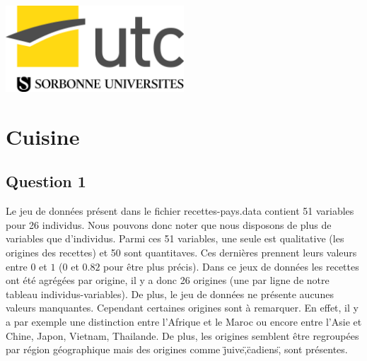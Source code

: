 \documentclass[a4paper,11pt,oneside,roman]{article}
\begin{document}
\begin{titlepage}
        
        \includegraphics[width=0.5\textwidth]{imgs/logo_UTC_SU.jpg}\\[1cm] %
        
    
        \vfill %
        
    \end{titlepage}
    
    
    \pagebreak
        
    \section{Cuisine}
    \subsection*{Question 1}
    Le jeu de données présent dans le fichier recettes-pays.data contient 51 variables pour 26 individus.
    Nous pouvons donc noter que nous disposons de plus de variables que d'individus.
    Parmi ces 51 variables, une seule est qualitative (les origines des recettes) et 50 sont quantitaves.
    Ces dernières prennent leurs valeurs entre $0$ et $1$ ($0$ et $0.82$ pour être plus précis).
    Dans ce jeux de données les recettes ont été agrégées par origine, il y a donc 26 origines (une par ligne de notre tableau individus-variables).
    De plus, le jeu de données ne présente aucunes valeurs manquantes.
    Cependant certaines origines sont à remarquer.
    En effet, il y a par exemple une distinction entre l'Afrique et le Maroc ou encore entre l'Asie et Chine, Japon, Vietnam, Thailande.
    De plus, les origines semblent être regroupées par région géographique mais des origines comme \"juive\",\"cadiens\", sont présentes.
\end{document}
